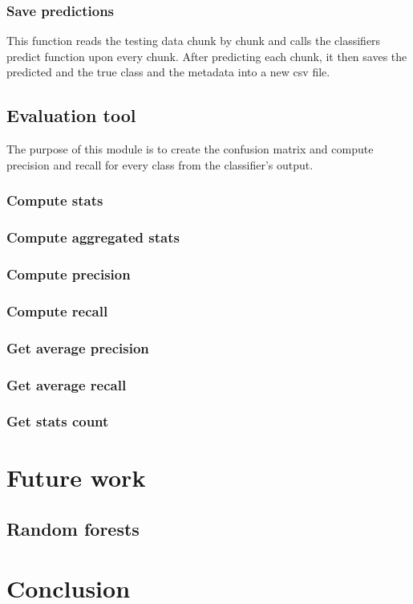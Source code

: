 \documentclass{article}
\begin{document}
      \subsubsection{Save predictions}
        This function reads the testing data chunk by chunk and calls the classifiers predict function upon every chunk. After predicting each chunk, it then saves the predicted and the true class and the metadata into a new csv file.
    \newpage
    \subsection{Evaluation tool}
      The purpose of this module is to create the confusion matrix and compute precision and recall for every class from the classifier's output.
      \subsubsection{Compute stats}
      \subsubsection{Compute aggregated stats}
      \subsubsection{Compute precision}
      \subsubsection{Compute recall}
      \subsubsection{Get average precision}
      \subsubsection{Get average recall}
      \subsubsection{Get stats count}
    \newpage
  \section{Future work}
    \subsection{Random forests}
    \newpage
  \section*{Conclusion}
\end{document}
